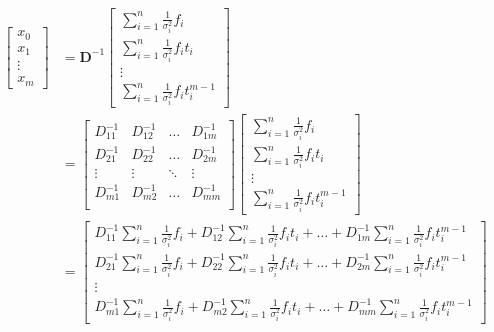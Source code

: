 \begin{align}
    \begin{bmatrix}
        x_{0}  \\
        x_{1}  \\
        \vdots \\
        x_{m}
    \end{bmatrix}
    &=
    \bm{D}^{-1}
    \begin{bmatrix}
        \sum_{i=1}^{n} \frac{1}{\sigma_{i}^{2}} f_{i} \\
        \sum_{i=1}^{n} \frac{1}{\sigma_{i}^{2}} f_{i} t_{i} \\
        \vdots \\
        \sum_{i=1}^{n} \frac{1}{\sigma_{i}^{2}} f_{i} t_{i}^{m-1}
    \end{bmatrix}
    \\
    &=
    \begin{bmatrix}
        D_{11}^{-1} & D_{12}^{-1} & \ldots & D_{1m}^{-1} \\
        D_{21}^{-1} & D_{22}^{-1} & \ldots & D_{2m}^{-1} \\
        \vdots & \vdots & \ddots & \vdots \\
        D_{m1}^{-1} & D_{m2}^{-1} & \ldots & D_{mm}^{-1} \\
    \end{bmatrix}
    \begin{bmatrix}
        \sum_{i=1}^{n} \frac{1}{\sigma_{i}^{2}} f_{i} \\
        \sum_{i=1}^{n} \frac{1}{\sigma_{i}^{2}} f_{i} t_{i} \\
        \vdots \\
        \sum_{i=1}^{n} \frac{1}{\sigma_{i}^{2}} f_{i} t_{i}^{m-1}
    \end{bmatrix}
    \\
    &=
    \begin{bmatrix}
        D_{11}^{-1} \sum_{i=1}^{n} \frac{1}{\sigma_{i}^{2}} f_{i} +
        D_{12}^{-1} \sum_{i=1}^{n} \frac{1}{\sigma_{i}^{2}} f_{i} t_{i} +
        \ldots +
        D_{1m}^{-1} \sum_{i=1}^{n} \frac{1}{\sigma_{i}^{2}} f_{i} t_{i}^{m-1}
        \\
        D_{21}^{-1} \sum_{i=1}^{n} \frac{1}{\sigma_{i}^{2}} f_{i} +
        D_{22}^{-1} \sum_{i=1}^{n} \frac{1}{\sigma_{i}^{2}} f_{i} t_{i} +
        \ldots +
        D_{2m}^{-1} \sum_{i=1}^{n} \frac{1}{\sigma_{i}^{2}} f_{i} t_{i}^{m-1}
        \\
        \vdots
        \\
        D_{m1}^{-1} \sum_{i=1}^{n} \frac{1}{\sigma_{i}^{2}} f_{i} +
        D_{m2}^{-1} \sum_{i=1}^{n} \frac{1}{\sigma_{i}^{2}} f_{i} t_{i} +
        \ldots +
        D_{mm}^{-1} \sum_{i=1}^{n} \frac{1}{\sigma_{i}^{2}} f_{i} t_{i}^{m-1}
    \end{bmatrix}
    \label{Eq:LSM-Coefficients-Solution}
\end{align}
